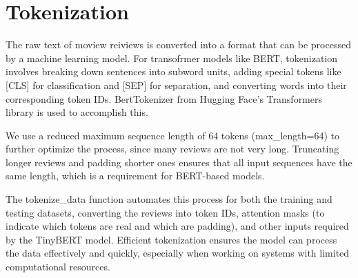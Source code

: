 \documentclass[11pt]{article}
\begin{document}
    \section{Tokenization}\label{tokenization}

    The raw text of moview reiviews is converted into a format that can be
processed by a machine learning model. For transofrmer models like BERT,
tokenization involves breaking down sentences into subword units, adding
special tokens like {[}CLS{]} for classification and {[}SEP{]} for
separation, and converting words into their corresponding token IDs.
BertTokenizer from Hugging Face's Transformers library is used to
accomplish this.

We use a reduced maximum sequence length of 64 tokens (max\_length=64)
to further optimize the process, since many reviews are not very long.
Truncating longer reviews and padding shorter ones ensures that all
input sequences have the same length, which is a requirement for
BERT-based models.

The tokenize\_data function automates this process for both the training
and testing datasets, converting the reviews into token IDs, attention
masks (to indicate which tokens are real and which are padding), and
other inputs required by the TinyBERT model. Efficient tokenization
ensures the model can process the data effectively and quickly,
especially when working on systems with limited computational resources.
\end{document}
